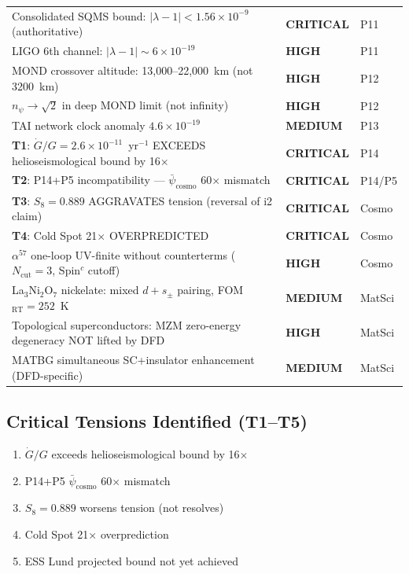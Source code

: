 \documentclass[11pt,a4paper]{article}
\newcommand{\CRITICAL}{\textcolor{critical}{\textbf{CRITICAL}}}
\newcommand{\HIGH}{\textcolor{high}{\textbf{HIGH}}}
\newcommand{\MEDIUM}{\textcolor{medium}{\textbf{MEDIUM}}}
\begin{document}
\begin{longtable}{p{}p{}p{}}
Consolidated SQMS bound: $|\lambda-1|<1.56\times10^{-9}$ (authoritative) & \CRITICAL & P11 \\
LIGO 6th channel: $|\lambda-1|\sim6\times10^{-19}$ & \HIGH & P11 \\
MOND crossover altitude: 13,000--22,000~km (not 3200~km) & \HIGH & P12 \\
$n_\psi\to\sqrt{2}$ in deep MOND limit (not infinity) & \HIGH & P12 \\
TAI network clock anomaly $4.6\times10^{-19}$ & \MEDIUM & P13 \\
\textbf{T1}: $\dot{G}/G = 2.6\times10^{-11}$~yr$^{-1}$ EXCEEDS helioseismological bound by 16$\times$ & \CRITICAL & P14 \\
\textbf{T2}: P14+P5 incompatibility --- $\bar\psi_\mathrm{cosmo}$ 60$\times$ mismatch & \CRITICAL & P14/P5 \\
\textbf{T3}: $S_8=0.889$ AGGRAVATES tension (reversal of i2 claim) & \CRITICAL & Cosmo \\
\textbf{T4}: Cold Spot 21$\times$ OVERPREDICTED & \CRITICAL & Cosmo \\
$\alpha^{57}$ one-loop UV-finite without counterterms ($N_\mathrm{cut}=3$, Spin$^c$ cutoff) & \HIGH & Cosmo \\
La$_3$Ni$_2$O$_7$ nickelate: mixed $d+s_\pm$ pairing, FOM$_\mathrm{RT}=252$~K & \MEDIUM & MatSci \\
Topological superconductors: MZM zero-energy degeneracy NOT lifted by DFD & \HIGH & MatSci \\
MATBG simultaneous SC+insulator enhancement (DFD-specific) & \MEDIUM & MatSci \\
\bottomrule
\end{longtable}

\subsection{Critical Tensions Identified (T1--T5)}
\begin{enumerate}[nosep]
\item[\textbf{T1}:] $\dot{G}/G$ exceeds helioseismological bound by 16$\times$
\item[\textbf{T2}:] P14+P5 $\bar\psi_\mathrm{cosmo}$ 60$\times$ mismatch
\item[\textbf{T3}:] $S_8=0.889$ worsens tension (not resolves)
\item[\textbf{T4}:] Cold Spot 21$\times$ overprediction
\item[\textbf{T5}:] ESS Lund projected bound not yet achieved
\end{enumerate}
\end{document}
